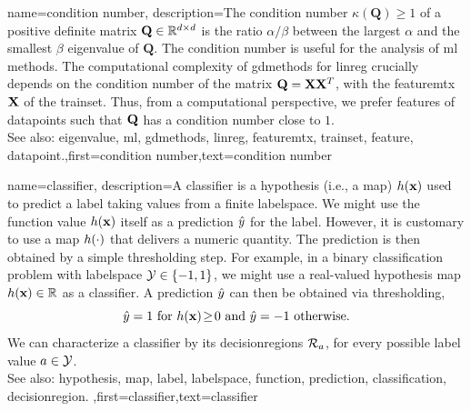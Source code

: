 {
	name={condition number},
	description={The condition number $\kappa(\mathbf{Q}) \geq 1$ of a 
		positive definite 
		matrix $\mathbf{Q} \in \mathbb{R}^{d \times d}$ is the ratio 
		$\alpha /\beta  $ between the 
		largest $\alpha$ and the smallest $\beta$ \gls{eigenvalue} of 
		$\mathbf{Q}$. The condition number is useful for the analysis of \gls{ml} methods. 
		The computational complexity of \gls{gdmethods} for \gls{linreg} crucially depends on the 
		condition number of the matrix $\mathbf{Q} = {\bf X} {\bf X}^{T}$, with the \gls{featuremtx} ${\bf X}$ 
		of the \gls{trainset}. Thus, from a computational perspective, we prefer \glspl{feature} of 
		\glspl{datapoint} such that $\mathbf{Q}$ has a condition number close to $1$.
					\\ 
		See also: \gls{eigenvalue}, \gls{ml}, \gls{gdmethods}, \gls{linreg}, \gls{featuremtx}, \gls{trainset}, \gls{feature}, \gls{datapoint}.},first={condition number},text={condition number} 
}

{
	name={classifier},
	description={A classifier is a \gls{hypothesis} (i.e., a \gls{map}) $h({\bf x})$ 
		used to predict a \gls{label} taking values from a finite \gls{labelspace}. We might use the 
		\gls{function} value $h({\bf x})$ itself as a \gls{prediction} $\hat{y}$ for 
		the \gls{label}. However, it is customary to use a \gls{map} $h(\cdot)$ that delivers 
		a numeric quantity. The \gls{prediction} is then obtained by a simple thresholding step. 
		For example, in a binary \gls{classification} problem with \gls{labelspace} $\mathcal{Y} \in  \{ -1,1\}$, 
		we might use a real-valued \gls{hypothesis} \gls{map} $h({\bf x}) \in \mathbb{R}$ 
		as a classifier. A \gls{prediction} $\hat{y}$ can then be obtained via thresholding,  
		 \begin{equation} 
		 	\label{equ_def_threshold_bin_classifier_dict}
		 	\hat{y} =1   \mbox{ for } h({\bf x})\!\geq\!0 \mbox{ and } 	\hat{y} =-1  \mbox{ otherwise.}
	 		\end{equation}
 		We can characterize a classifier by its \glspl{decisionregion} $\mathcal{R}_{a}$, for 
 		every possible \gls{label} value $a \in \mathcal{Y}$.
					\\ 
		See also: \gls{hypothesis}, \gls{map}, \gls{label}, \gls{labelspace}, \gls{function}, \gls{prediction}, \gls{classification}, \gls{decisionregion}. },first={classifier},text={classifier} 
}

